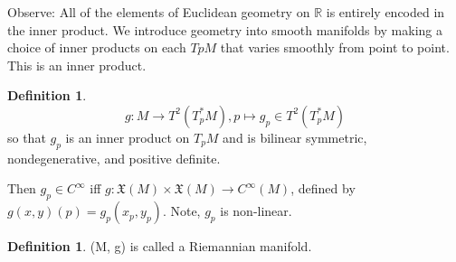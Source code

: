 \documentclass{article}
\theoremstyle{definition}
\newtheorem{defn}[theorem]{Definition}
\newenvironment{definition}
  {\vspace{8pt}\begin{mdframed}[backgroundcolor=blueish]\begin{defn}}
  {\end{defn}\end{mdframed}\vspace{4pt}}
\begin{document}
Observe: All of the elements of Euclidean geometry on $\mathbb R$ is entirely encoded in the inner product. We introduce geometry into smooth manifolds by making a choice of inner products on each $TpM$ that varies smoothly from point to point. This is an inner product.

\begin{definition}

\[
    g: M \rightarrow T^2 (T^*_pM), p\mapsto g_p \in T^2 (T^*_pM)
\]
so that $g_p$ is an inner product on $T_pM$ and is bilinear symmetric, nondegenerative, and positive definite.

Then $g_p \in C^\infty$ iff $g: \mathfrak X(M) \times \mathfrak X(M) \rightarrow C^\infty(M)$, defined by  $g(x,y)(p )= g_p(x_p, y_p)$. Note, $g_p$ is non-linear.
\end{definition}

\begin{definition}

(M, g) is called a Riemannian manifold.
\end{definition}
\end{document}
